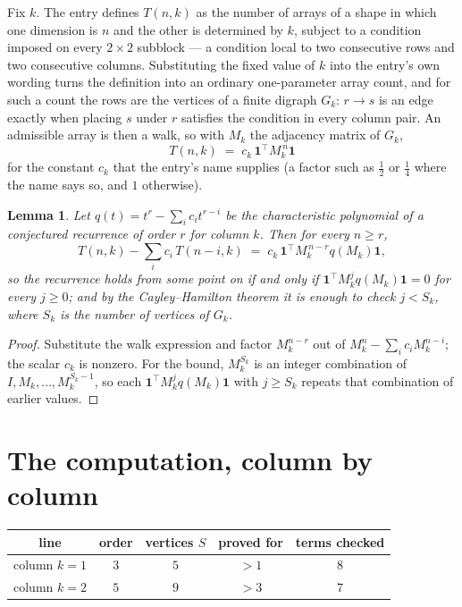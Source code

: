 \documentclass[11pt,a4paper]{article}
\theoremstyle{plain}
\newtheorem{lemma}[theorem]{Lemma}
\theoremstyle{definition}
\begin{document}
Fix $k$. The entry defines $T(n,k)$ as the number of arrays of a shape in which one dimension
is $n$ and the other is determined by $k$, subject to a condition imposed on every
$2\times2$ subblock --- a condition local to two consecutive rows and two consecutive columns.
Substituting the fixed value of $k$ into the entry's own wording turns the definition into an
ordinary one-parameter array count, and for such a count the rows are the vertices of a finite
digraph $G_k$: $r\to s$ is an edge exactly when placing $s$ under $r$ satisfies the condition
in every column pair. An admissible array is then a walk, so with $M_k$ the adjacency matrix
of $G_k$,
\[
T(n,k)\;=\;c_k\,\mathbf{1}^{\!\top}M_k^{\,n}\mathbf{1}
\]
for the constant $c_k$ that the entry's name supplies (a factor such as $\tfrac12$ or
$\tfrac14$ where the name says so, and $1$ otherwise).

\begin{lemma}\label{lem:crit}
Let $q(t)=t^{r}-\sum_i c_it^{r-i}$ be the characteristic polynomial of a conjectured
recurrence of order $r$ for column $k$. Then for every $n\ge r$,
\[
T(n,k)-\sum_i c_i\,T(n-i,k)\;=\;c_k\,\mathbf{1}^{\!\top}M_k^{\,n-r}q(M_k)\mathbf{1},
\]
so the recurrence holds from some point on if and only if
$\mathbf{1}^{\!\top}M_k^{j}q(M_k)\mathbf{1}=0$ for every $j\ge0$; and by the
Cayley--Hamilton theorem it is enough to check $j<S_k$, where $S_k$ is the number of vertices
of $G_k$.
\end{lemma}

\begin{proof}
Substitute the walk expression and factor $M_k^{n-r}$ out of $M_k^{n}-\sum_ic_iM_k^{n-i}$;
the scalar $c_k$ is nonzero. For the bound, $M_k^{S_k}$ is an integer combination of
$I,M_k,\dots,M_k^{S_k-1}$, so each $\mathbf{1}^{\!\top}M_k^{j}q(M_k)\mathbf{1}$ with
$j\ge S_k$ repeats that combination of earlier values.
\end{proof}

\section{The computation, column by column}

\begin{center}
\begin{tabular}{ccccc}
line & order & vertices $S$ & proved for & terms checked \\ \hline
column $k$$=1$ & $3$ & $5$ & $>1$ & $8$ \\
column $k$$=2$ & $5$ & $9$ & $>3$ & $7$ \\
\end{tabular}
\end{center}
\end{document}
